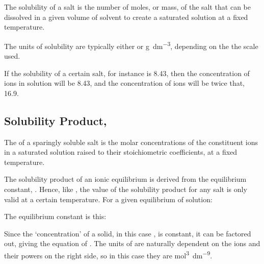 			The solubility of a salt is the number of moles, or mass, of the salt that can be dissolved in a given volume of solvent to create
			a saturated solution at a fixed temperature.

			The units of solubility are typically either \si{\molarConc} or \si{\gram\per\cubic\deci\metre}, depending on the
			the scale used.

			If the solubility of a certain salt, for instance  is \SI{8.43}{\molarConc}, then the concentration of 
			ions in solution will be \SI{8.43}{\molarConc}, and the concentration of  ions will be twice that, \SI{16.9}{\molarConc}.



		\subsection{Solubility Product, \MKsp{}}

			The \Ksp{} of a sparingly soluble salt is the molar concentrations of the constituent ions in a saturated solution raised to their stoichiometric coefficients, at a fixed temperature.

			The solubility product of an ionic equilibrium is derived from the equilibrium constant, \Kc{}. Hence, like \Kc{}, the value of the solubility product for any salt is only valid at a certain temperature. For a given equilibrium of solution:


			The equilibrium constant is this:


			Since the `concentration' of a solid, in this case , is constant, it can be factored out, giving the equation of \Ksp{}. The units of \Ksp{} are naturally dependent on the ions and their powers on the right side, so in this case they are
			\si{\mole\tothe{3}\per\deci\metre\tothe{9}}.


